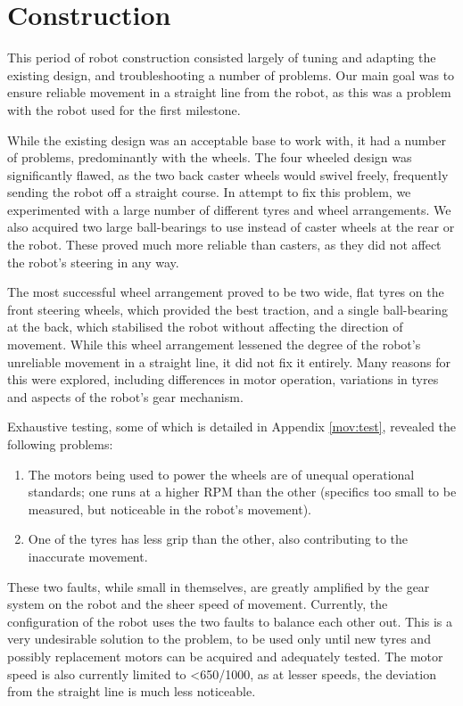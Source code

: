 \documentclass[conference,12pt]{IEEEtran}
\begin{document}
\section{Construction}	
\vspace{-2 mm}
This period of robot construction consisted largely of tuning and adapting the existing design, and troubleshooting a number of problems. Our main goal was to ensure reliable movement in a straight line from the robot, as this was a problem with the robot used for the first milestone.

While the existing design was an acceptable base to work with, it had a number of problems, predominantly with the wheels. The four wheeled design was significantly flawed, as the two back caster wheels would swivel freely, frequently sending the robot off a straight course. In attempt to fix this problem, we experimented with a large number of different tyres and wheel arrangements. We also acquired two large ball-bearings to use instead of caster wheels at the rear or the robot. These proved much more reliable than casters, as they did not affect the robot's steering in any way.

The most successful wheel arrangement proved to be two wide, flat tyres on the front steering wheels, which provided the best traction, and a single ball-bearing at the back, which stabilised the robot without affecting the direction of movement. While this wheel arrangement lessened the degree of the robot's unreliable movement in a straight line, it did not fix it entirely. Many reasons for this were explored, including differences in motor operation, variations in tyres and aspects of the robot's gear mechanism.

Exhaustive testing, some of which is detailed in Appendix \ref{mov:test}, revealed the following problems:
\begin{enumerate}
\item The motors being used to power the wheels are of unequal operational standards; one runs at a higher RPM than the other (specifics too small to be measured, but noticeable in the robot's movement).
\item One of the tyres has less grip than the other, also contributing to the inaccurate movement.
\end{enumerate}                         

These two faults, while small in themselves, are greatly amplified by the gear system on the robot and the sheer speed of movement. Currently, the configuration of the robot uses the two faults to balance each other out. This is a very undesirable solution to the problem, to be used only until new tyres and possibly replacement motors can be acquired and adequately tested. The motor speed is also currently limited to <650/1000, as at lesser speeds, the deviation from the straight line is much less noticeable.
\end{document}
